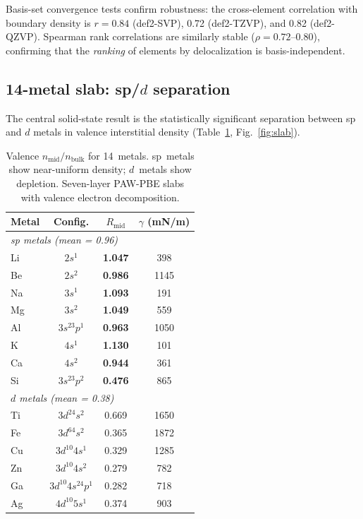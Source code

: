\documentclass[twocolumn,showpacs,preprintnumbers,amsmath,amssymb,prb]{revtex4-2}
\begin{document}
Basis-set convergence tests confirm robustness:
the cross-element correlation with boundary density is
$r = 0.84$ (def2-SVP), 0.72 (def2-TZVP), and 0.82 (def2-QZVP).
Spearman rank correlations are similarly stable
($\rho = 0.72$--$0.80$), confirming that the \emph{ranking}
of elements by delocalization is basis-independent.


\subsection{14-metal slab: sp/$d$ separation}

The central solid-state result is the statistically significant
separation between sp and $d$ metals
in valence interstitial density (Table~\ref{tab:slab},
Fig.~\ref{fig:slab}).

\begin{table}[htb]
  \centering
  \caption{Valence $n_\mathrm{mid}/n_\mathrm{bulk}$ for 14~metals.
    sp~metals show near-uniform density; $d$~metals show depletion.
    Seven-layer PAW-PBE slabs with valence electron decomposition.}
  \label{tab:slab}
  \begin{ruledtabular}
  \begin{tabular}{lccc}
    Metal & Config. & $R_\mathrm{mid}$ & $\gamma$ (mN/m) \\
    \hline
    \multicolumn{4}{l}{\emph{sp metals (mean = 0.96)}} \\
    Li  & $2s^1$         & \textbf{1.047} &  398 \\
    Be  & $2s^2$         & \textbf{0.986} & 1145 \\
    Na  & $3s^1$         & \textbf{1.093} &  191 \\
    Mg  & $3s^2$         & \textbf{1.049} &  559 \\
    Al  & $3s^23p^1$     & \textbf{0.963} & 1050 \\
    K   & $4s^1$         & \textbf{1.130} &  101 \\
    Ca  & $4s^2$         & \textbf{0.944} &  361 \\
    Si  & $3s^23p^2$     & \textbf{0.476} &  865 \\
    \hline
    \multicolumn{4}{l}{\emph{$d$ metals (mean = 0.38)}} \\
    Ti  & $3d^24s^2$     & 0.669 & 1650 \\
    Fe  & $3d^64s^2$     & 0.365 & 1872 \\
    Cu  & $3d^{10}4s^1$  & 0.329 & 1285 \\
    Zn  & $3d^{10}4s^2$  & 0.279 &  782 \\
    Ga  & $3d^{10}4s^24p^1$ & 0.282 &  718 \\
    Ag  & $4d^{10}5s^1$  & 0.374 &  903 \\
  \end{tabular}
  \end{ruledtabular}
\end{table}
\end{document}

